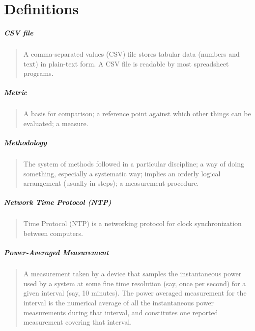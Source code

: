 \chapter{Definitions}
\label{sec:definitions}

\setlength{\parskip}{1pt}
\paragraph*{CSV file}
\begin{quote}
A comma-separated values (CSV) file stores tabular data (numbers and text) in plain-text form. A CSV file is readable by most spreadsheet programs.
\end{quote}

\paragraph*{Metric}
\begin{quote}
A basis for comparison; a reference point against which other things can be evaluated; a measure.
\end{quote}

\paragraph*{Methodology}
\begin{quote}
The system of methods followed in a particular discipline; a way of doing something, especially a systematic way; implies an orderly logical arrangement (usually in steps); a measurement procedure.
\end{quote}


\paragraph*{Network Time Protocol (NTP)}
\begin{quote}
Time Protocol (NTP) is a networking protocol for clock synchronization between computers.
\end{quote}

\paragraph*{Power-Averaged Measurement}
\begin{quote}
A measurement taken by a device that samples the instantaneous power used by a system at some fine
time resolution (say, once per second) for a given interval (say, 10 minutes).  The power averaged
measurement for the interval is the numerical average of all the instantaneous power measurements
during that interval, and constitutes one reported measurement covering that interval.
\end{quote}


